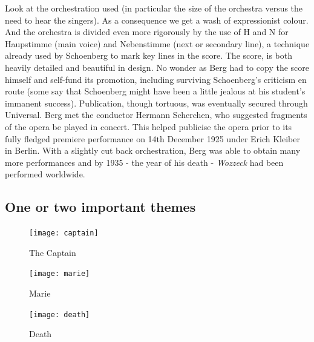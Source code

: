 Look at the orchestration used (in particular the size of the orchestra versus the need to hear the singers). As a consequence we get a wash of expressionist colour. And the orchestra is divided even more rigorously by the use of H and N for Haupstimme (main voice) and Nebenstimme (next or secondary line), a technique already used by Schoenberg to mark key lines in the score. The score, is both heavily detailed and beautiful in design. No wonder as Berg had to copy the score himself and self-fund its promotion, including surviving Schoenberg's criticism en route (some say that Schoenberg might have been a little jealous at his student's immanent success). Publication, though tortuous, was eventually secured through Universal. Berg met the conductor Hermann Scherchen, who suggested fragments of the opera be played in concert. This helped publicise the opera prior to its fully fledged premiere performance on 14th December 1925 under Erich Kleiber in Berlin. With a slightly cut back orchestration, Berg was able to obtain many more performances and by 1935 - the year of his death - \textit{Wozzeck} had been performed worldwide.  

\subsection{One or two important themes}

\begin{figure}[H]
\centering
\texttt{[image: captain]}\caption{The Captain}
\label{fig:captain}
\end{figure}


\begin{figure}[H]
\centering
\texttt{[image: marie]}\caption{Marie}
\label{fig:marie}
\end{figure}


\begin{figure}[H]
\centering
\texttt{[image: death]}\caption{Death}
\label{fig:death}
\end{figure}



